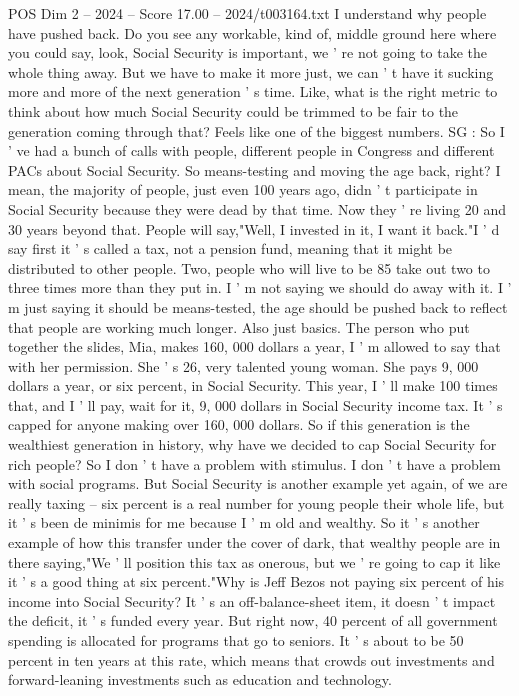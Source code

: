 \begin{textsample}{POS Dim 2 – 2024 – Score 17.00 – 2024/t003164.txt}
I understand why people have pushed back.
Do you see any workable, kind of, middle ground here where you could say, look, Social Security is important, we ' re not going to take the whole thing away.
But we have to make it more just, we can ' t have it sucking more and more of the next generation ' s time.
Like, what is the right metric to think about how much Social Security could be trimmed to be fair to the generation coming through that?
Feels like one of the biggest numbers.
SG : So I ' ve had a bunch of calls with people, different people in Congress and different PACs about Social Security.
So means-testing and moving the age back, right?
I mean, the majority of people, just even 100 years ago, didn ' t participate in Social Security because they were dead by that time.
Now they ' re living 20 and 30 years beyond that.
People will say,"Well, I invested in it, I want it back."I ' d say first it ' s called a tax, not a pension fund, meaning that it might be distributed to other people.
Two, people who will live to be 85 take out two to three times more than they put in.
I ' m not saying we should do away with it.
I ' m just saying it should be means-tested, the age should be pushed back to reflect that people are working much longer.
Also just basics.
The person who put together the slides, Mia, makes 160, 000 dollars a year, I ' m allowed to say that with her permission.
She ' s 26, very talented young woman.
She pays 9, 000 dollars a year, or six percent, in Social Security.
This year, I ' ll make 100 times that, and I ' ll pay, wait for it, 9, 000 dollars in Social Security income tax.
It ' s capped for anyone making over 160, 000 dollars.
So if this generation is the wealthiest generation in history, why have we decided to cap Social Security for rich people?
So I don ' t have a problem with stimulus.
I don ' t have a problem with social programs.
But Social Security is another example yet again, of we are really taxing -- six percent is a real number for young people their whole life, but it ' s been de minimis for me because I ' m old and wealthy.
So it ' s another example of how this transfer under the cover of dark, that wealthy people are in there saying,"We ' ll position this tax as onerous, but we ' re going to cap it like it ' s a good thing at six percent."Why is Jeff Bezos not paying six percent of his income into Social Security?
It ' s an off-balance-sheet item, it doesn ' t impact the deficit, it ' s funded every year.
But right now, 40 percent of all government spending is allocated for programs that go to seniors.
It ' s about to be 50 percent in ten years at this rate, which means that crowds out investments and forward-leaning investments such as education and technology.

\end{textsample}
